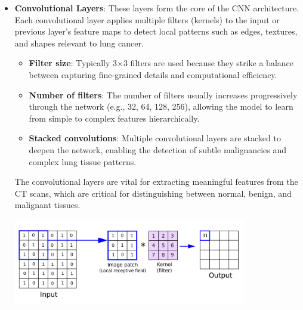 \begin{itemize}
    \item \textbf{Convolutional Layers}: These layers form the core of the CNN architecture. Each 
    convolutional layer applies multiple filters (kernels) to the input or previous layer’s feature 
    maps to detect local patterns such as edges, textures, and shapes relevant to lung cancer.

        \begin{itemize}
            \item \textbf{Filter size}: Typically 3×3 filters are used because they strike a balance 
            between capturing fine-grained details and computational efficiency. \cite{sr2025}

            \item \textbf{Number of filters}: The number of filters usually increases progressively 
            through the network (e.g., 32, 64, 128, 256), allowing the model to learn from simple to 
            complex features hierarchically.

            \item \textbf{Stacked convolutions}: Multiple convolutional layers are stacked to deepen 
            the network, enabling the detection of subtle malignancies and complex lung tissue 
            patterns.
        \end{itemize}

    The convolutional layers are vital for extracting meaningful features from the CT scans, which 
    are critical for distinguishing between normal, benign, and malignant tissues.

    \vspace{1em}
    \begin{center} 
        \includegraphics[width = 0.8\textwidth]
        {../assets/03-model-architecture/convolutional-layer.png}


\end{center}
\end{itemize}
